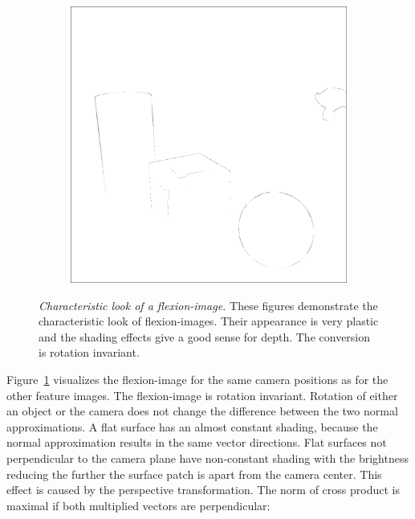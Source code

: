 \begin{figure}[tb]
\begin{subfigure}[t]{0.32\textwidth}
    \end{subfigure}
    \begin{subfigure}[t]{0.32\textwidth}
        \includegraphics[width=\linewidth]{chapter04/img/flexion-0210.png}
    \end{subfigure}
    \caption[Characteristic look of a \gls{flexion-image}]{\emph{Characteristic look of a \gls{flexion-image}.} These figures demonstrate the characteristic look of \Glspl{flexion-image}. Their appearance is very plastic and the shading effects give a good sense for depth. The conversion is rotation invariant.}\label{fig:flexion_images}
\end{figure}
Figure~\ref{fig:flexion_images} visualizes the \Gls{flexion-image} for the same camera positions as for the other feature images.
The \gls{flexion-image} is rotation invariant.
Rotation of either an object or the camera does not change the difference between the two normal approximations.
A flat surface has an almost constant shading, because the normal approximation results in the same vector directions.
Flat surfaces not perpendicular to the camera plane have non-constant shading with the brightness reducing the further the surface patch is apart from the camera center.
This effect is caused by the perspective transformation.
The norm of cross product is maximal if both multiplied vectors are perpendicular:
